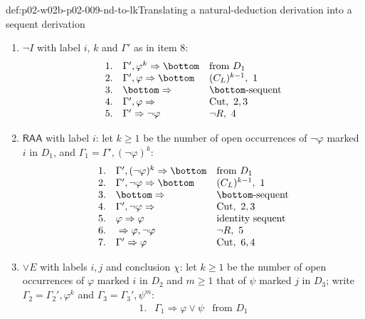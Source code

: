 \begin{hbmethod}{def:p02-w02b-p02-009-nd-to-lk}{Translating a natural-deduction derivation into a sequent derivation}
\begin{enumerate}
    \(\Gamma'=\operatorname{om}(D)\):
    \[
    \begin{array}{rll}
    1.&\Gamma',\varphi^{k}\Rightarrow\psi&\text{from }D_1\\
    2.&\Gamma',\varphi\Rightarrow\psi&(C_L)^{k-1},\ 1\\
    3.&\Gamma'\Rightarrow\varphi\to\psi&\to R,\ 2
    \end{array}
    \]
  \item \(\neg I\) with label \(i\), \(k\) and \(\Gamma'\) as in item 8:
    \[
    \begin{array}{rll}
    1.&\Gamma',\varphi^{k}\Rightarrow\bottom&\text{from }D_1\\
    2.&\Gamma',\varphi\Rightarrow\bottom&(C_L)^{k-1},\ 1\\
    3.&\bottom\Rightarrow{}&\bottom\text{-sequent}\\
    4.&\Gamma',\varphi\Rightarrow{}&\mathrm{Cut},\ 2,3\\
    5.&\Gamma'\Rightarrow\neg\varphi&\neg R,\ 4
    \end{array}
    \]
  \item \(\mathsf{RAA}\) with label \(i\): let \(k\geq1\) be the number of
    open occurrences of \(\neg\varphi\) marked \(i\) in \(D_1\), and
    \(\Gamma_1=\Gamma',(\neg\varphi)^{k}\):
    \[
    \begin{array}{rll}
    1.&\Gamma',(\neg\varphi)^{k}\Rightarrow\bottom&\text{from }D_1\\
    2.&\Gamma',\neg\varphi\Rightarrow\bottom&(C_L)^{k-1},\ 1\\
    3.&\bottom\Rightarrow{}&\bottom\text{-sequent}\\
    4.&\Gamma',\neg\varphi\Rightarrow{}&\mathrm{Cut},\ 2,3\\
    5.&\varphi\Rightarrow\varphi&\text{identity sequent}\\
    6.&{}\Rightarrow\varphi,\neg\varphi&\neg R,\ 5\\
    7.&\Gamma'\Rightarrow\varphi&\mathrm{Cut},\ 6,4
    \end{array}
    \]
  \item \(\lor E\) with labels \(i,j\) and conclusion \(\chi\): let
    \(k\geq1\) be the number of open occurrences of \(\varphi\) marked
    \(i\) in \(D_2\) and \(m\geq1\) that of \(\psi\) marked \(j\) in \(D_3\);
    write \(\Gamma_2=\Gamma_2',\varphi^{k}\) and
    \(\Gamma_3=\Gamma_3',\psi^{m}\):
    \[
    \begin{array}{rll}
    1.&\Gamma_1\Rightarrow\varphi\lor\psi&\text{from }D_1\\

\end{array}\]
\end{enumerate}
\end{hbmethod}
